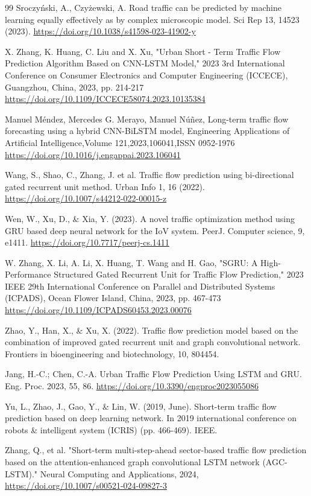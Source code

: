 \documentclass[conference]{IEEEtran}
\begin{document}
\begin{thebibliography}{99}
 Sroczyński, A., Czyżewski, A. Road traffic can be predicted by machine learning equally effectively as by complex microscopic model. Sci Rep 13, 14523 (2023). \url{https://doi.org/10.1038/s41598-023-41902-y}

 X. Zhang, K. Huang, C. Liu and X. Xu, "Urban Short - Term Traffic Flow Prediction Algorithm Based on CNN-LSTM Model," 2023 3rd International Conference on Consumer Electronics and Computer Engineering (ICCECE), Guangzhou, China, 2023, pp. 214-217 \url{https://doi.org/10.1109/ICCECE58074.2023.10135384}

 Manuel Méndez, Mercedes G. Merayo, Manuel Núñez,
Long-term traffic flow forecasting using a hybrid CNN-BiLSTM model,
Engineering Applications of Artificial Intelligence,Volume 121,2023,106041,ISSN 0952-1976 \url{https://doi.org/10.1016/j.engappai.2023.106041}

 Wang, S., Shao, C., Zhang, J. et al. Traffic flow prediction using bi-directional gated recurrent unit method. Urban Info 1, 16 (2022). \url{https://doi.org/10.1007/s44212-022-00015-z}

 Wen, W., Xu, D., \& Xia, Y. (2023). A novel traffic optimization method using GRU based deep neural network for the IoV system. PeerJ. Computer science, 9, e1411. \url{https://doi.org/10.7717/peerj-cs.1411}

 W. Zhang, X. Li, A. Li, X. Huang, T. Wang and H. Gao, "SGRU: A High-Performance Structured Gated Recurrent Unit for Traffic Flow Prediction," 2023 IEEE 29th International Conference on Parallel and Distributed Systems (ICPADS), Ocean Flower Island, China, 2023, pp. 467-473 \url{https://doi.org/10.1109/ICPADS60453.2023.00076}

 Zhao, Y., Han, X., \& Xu, X. (2022). Traffic flow prediction model based on the combination of improved gated recurrent unit and graph convolutional network. Frontiers in bioengineering and biotechnology, 10, 804454.

 Jang, H.-C.; Chen, C.-A. Urban Traffic Flow Prediction Using LSTM and GRU. Eng. Proc. 2023, 55, 86. \url{https://doi.org/10.3390/engproc2023055086}

 Yu, L., Zhao, J., Gao, Y., \& Lin, W. (2019, June). Short-term traffic flow prediction based on deep learning network. In 2019 international conference on robots \& intelligent system (ICRIS) (pp. 466-469). IEEE.

 Zhang, Q., et al. "Short-term multi-step-ahead sector-based traffic flow prediction based on the attention-enhanced graph convolutional LSTM network (AGC-LSTM)." Neural Computing and Applications, 2024, \url{https://doi.org/10.1007/s00521-024-09827-3}



\end{thebibliography}
\end{document}
